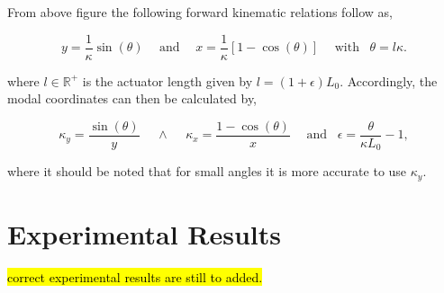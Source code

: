 From above figure the following forward kinematic relations follow as,


\begin{equation}
    y = \frac{1}{\kappa}\sin(\theta) \hspace{15pt} \text{and} \hspace{15pt}    x = \frac{1}{\kappa}[1-\cos(\theta)] \hspace{15pt} \text{with} \hspace{10pt}   \theta = l \kappa.
\end{equation}

where $l \in \mathbb{R}^{+}$ is the actuator length given by $l = (1+\epsilon)L_0$. Accordingly, the modal coordinates can then be calculated by,

\begin{equation}
    \kappa_y = \frac{\sin(\theta)}{y} \hspace{15pt} 	\land \hspace{15pt}  \kappa_x = \frac{1 -\cos(\theta)}{x} \hspace{15pt} \text{and} \hspace{10pt} \epsilon = \frac{\theta}{\kappa L_0} -1,
\end{equation}

where it should be noted that for small angles it is more accurate to use $\kappa_y$.

\section{Experimental Results}

\hl{correct experimental results are still to added.}






